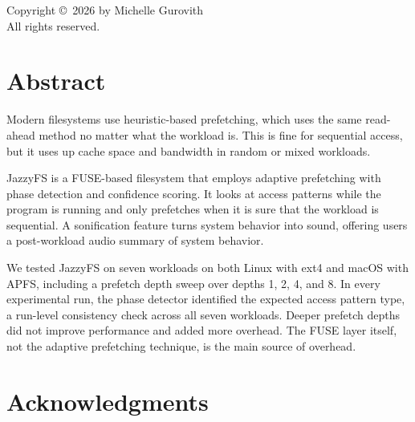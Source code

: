 \documentclass[12pt]{report}
\begin{document}
\thispagestyle{empty}
\vspace*{\fill}
\begin{center}
    Copyright \copyright\ 2026 by Michelle Gurovith\\
    All rights reserved.
\end{center}
\vspace*{\fill}
\newpage

\setcounter{page}{3}

\tableofcontents
\newpage

\listoffigures
\newpage

\listoftables
\newpage

\chapter*{Abstract}

Modern filesystems use heuristic-based prefetching, which uses the same
read-ahead method no matter what the workload is. This is fine for
sequential access, but it uses up cache space and bandwidth in random or
mixed workloads.

JazzyFS is a FUSE-based filesystem that employs adaptive prefetching with
phase detection and confidence scoring. It looks at access patterns while
the program is running and only prefetches when it is sure that the workload
is sequential. A sonification feature turns system behavior into sound,
offering users a post-workload audio summary of system behavior.

We tested JazzyFS on seven workloads on both Linux with ext4 and macOS with
APFS, including a prefetch depth sweep over depths 1, 2, 4, and 8. In every experimental run, the phase detector identified the expected
access pattern type, a run-level consistency check across all seven
workloads. Deeper prefetch depths did
not improve performance and added more overhead. The FUSE layer itself, not
the adaptive prefetching technique, is the main source of overhead.

\newpage

\chapter*{Acknowledgments}
\end{document}
